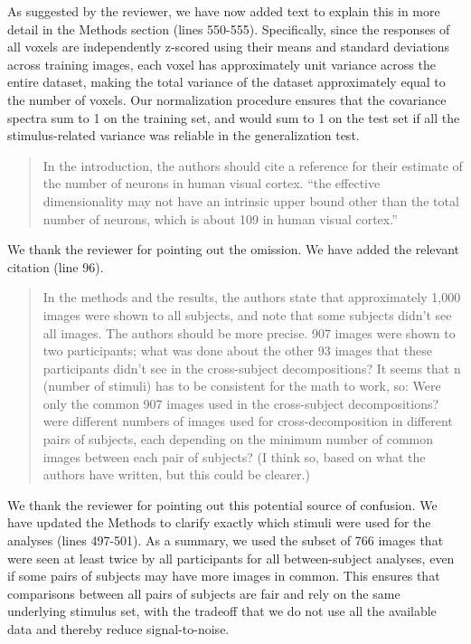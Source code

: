 \documentclass[10pt]{article}
\begin{document}
As suggested by the reviewer, we have now added text to explain this in more detail in the Methods section (lines 550-555). Specifically, since the responses of all voxels are independently z-scored using their means and standard deviations across training images, each voxel has approximately unit variance across the entire dataset, making the total variance of the dataset approximately equal to the number of voxels. Our normalization procedure ensures that the covariance spectra sum to 1 on the training set, and would sum to 1 on the test set if all the stimulus-related variance was reliable in the generalization test.

\begin{quote}
In the introduction, the authors should cite a reference for their estimate of the number of neurons in human visual cortex. ``the effective dimensionality may not have an intrinsic upper bound other than the total number of neurons, which is about 109 in human visual cortex.''
\end{quote}

We thank the reviewer for pointing out the omission. We have added the relevant citation (line 96).

\begin{quote}
In the methods and the results, the authors state that approximately 1,000 images were shown to all subjects, and note that some subjects didn't see all images. The authors should be more precise. 907 images were shown to two participants; what was done about the other 93 images that these participants didn't see in the cross-subject decompositions? It seems that n (number of stimuli) has to be consistent for the math to work, so: Were only the common 907 images used in the cross-subject decompositions? were different numbers of images used for cross-decomposition in different pairs of subjects, each depending on the minimum number of common images between each pair of subjects? (I think so, based on what the authors have written, but this could be clearer.)
\end{quote}

We thank the reviewer for pointing out this potential source of confusion. We have updated the Methods to clarify exactly which stimuli were used for the analyses (lines 497-501). As a summary, we used the subset of 766 images that were seen at least twice by all participants for all between-subject analyses, even if some pairs of subjects may have more images in common. This ensures that comparisons between all pairs of subjects are fair and rely on the same underlying stimulus set, with the tradeoff that we do not use all the available data and thereby reduce signal-to-noise.
\end{document}
